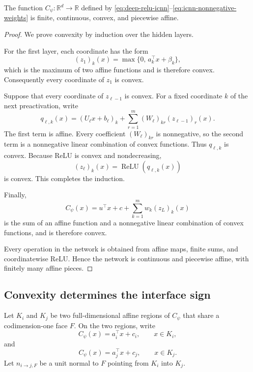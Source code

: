 \begin{proposition}
\label{prop:deep-relu-icnn-convex}
The function \(C_\psi:\mathbb R^d\to\mathbb R\) defined by
\eqref{eq:deep-relu-icnn}--\eqref{eq:icnn-nonnegative-weights} is finite,
continuous, convex, and piecewise affine.
\end{proposition}

\begin{proof}
We prove convexity by induction over the hidden layers.

For the first layer, each coordinate has the form
\[
    (z_1)_k(x)
    =
    \max\{0,\,a_k^\top x+\beta_k\},
\]
which is the maximum of two affine functions and is therefore convex.
Consequently every coordinate of \(z_1\) is convex.

Suppose that every coordinate of \(z_{\ell-1}\) is convex.  For a fixed
coordinate \(k\) of the next preactivation, write
\[
    q_{\ell,k}(x)
    =
    (U_\ell x+b_\ell)_k
    +
    \sum_{r=1}^m (W_\ell)_{kr}(z_{\ell-1})_r(x).
\]
The first term is affine.  Every coefficient \((W_\ell)_{kr}\) is
nonnegative, so the second term is a nonnegative linear combination of convex
functions.  Thus \(q_{\ell,k}\) is convex.  Because ReLU is convex and
nondecreasing,
\[
    (z_\ell)_k(x)
    =
    \operatorname{ReLU}(q_{\ell,k}(x))
\]
is convex.  This completes the induction.

Finally,
\[
    C_\psi(x)
    =
    u^\top x+c+
    \sum_{k=1}^m w_k(z_L)_k(x)
\]
is the sum of an affine function and a nonnegative linear combination of
convex functions, and is therefore convex.

Every operation in the network is obtained from affine maps, finite sums, and
coordinatewise ReLU.  Hence the network is continuous and piecewise affine,
with finitely many affine pieces.
\end{proof}

\subsection{Convexity determines the interface sign}

Let \(K_i\) and \(K_j\) be two full-dimensional affine regions of
\(C_\psi\) that share a codimension-one face \(F\).  On the two regions,
write
\[
    C_\psi(x)=a_i^\top x+c_i,
    \qquad x\in K_i,
\]
and
\[
    C_\psi(x)=a_j^\top x+c_j,
    \qquad x\in K_j.
\]
Let \(n_{i\to j,F}\) be a unit normal to \(F\) pointing from \(K_i\) into
\(K_j\).

